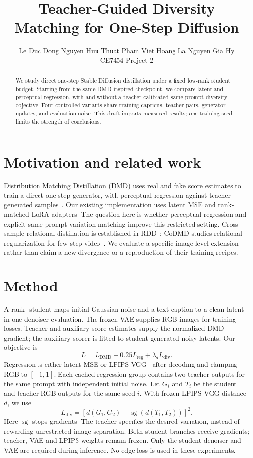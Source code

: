 \documentclass[10pt,twocolumn,letterpaper]{article}
\title{Teacher-Guided Diversity Matching for One-Step Diffusion}
\author{Le Duc Dong \quad Nguyen Huu Thuat \quad Pham Viet Hoang \quad La Nguyen Gia Hy\\CE7454 Project 2}
\begin{document}
\maketitle
\begin{abstract}
We study direct one-step Stable Diffusion distillation under a fixed low-rank
student budget. Starting from the same DMD-inspired checkpoint, we compare
latent and perceptual regression, with and without a teacher-calibrated
same-prompt diversity objective. Four controlled variants share training
captions, teacher pairs, generator updates, and evaluation noise. This draft
imports measured results; one training seed limits the strength of conclusions.
\end{abstract}
\section{Motivation and related work}
Distribution Matching Distillation (DMD) uses real and fake score estimates
to train a direct one-step generator, with perceptual regression against
teacher-generated samples~\cite{yin2024dmd}. Our existing implementation uses
latent MSE and rank-matched LoRA adapters. The question here is whether
perceptual regression and explicit same-prompt variation matching improve this
restricted setting. Cross-sample relational distillation is established in
RDD~\cite{feng2024rdd}; CoDMD studies relational regularization for few-step
video~\cite{zhang2026codmd}. We evaluate a specific image-level extension rather
than claim a new divergence or a reproduction of their training recipes.
\section{Method}
A rank-\DMDStudentRank{} student maps initial Gaussian noise and a text caption
to a clean latent in one denoiser evaluation. The frozen VAE supplies RGB images
for training losses. Teacher and auxiliary score estimates supply the normalized
DMD gradient; the auxiliary scorer is fitted to student-generated noisy latents.
Our objective is
\begin{equation}
L=L_{\mathrm{DMD}}+0.25L_{\mathrm{reg}}+\lambda_d L_{\mathrm{div}}.
\end{equation}
Regression is either latent MSE or LPIPS-VGG~\cite{zhang2018lpips} after decoding
and clamping RGB to $[-1,1]$. Each cached regression group contains two teacher
outputs for the same prompt with independent initial noise. Let $G_i$ and $T_i$
be the student and teacher RGB outputs for the same seed $i$. With frozen
LPIPS-VGG distance $d$, we use
\begin{equation}
L_{\mathrm{div}}=\left[d(G_1,G_2)-\operatorname{sg}(d(T_1,T_2))\right]^2.
\end{equation}
Here $\operatorname{sg}$ stops gradients. The teacher specifies the desired
variation, instead of rewarding unrestricted image separation. Both student
branches receive gradients; teacher, VAE and LPIPS weights remain frozen.
Only the student denoiser and VAE are required during inference. No edge loss
is used in these experiments.
\end{document}
